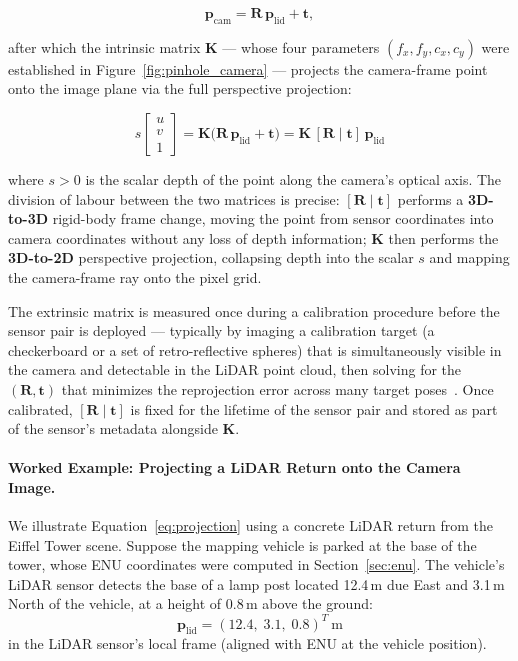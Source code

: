 \documentclass{book}
\begin{document}
\begin{equation}
  \mathbf{p}_{\text{cam}} = \mathbf{R}\,\mathbf{p}_{\text{lid}} + \mathbf{t},
  \label{eq:extrinsic}
\end{equation}

after which the intrinsic matrix $\mathbf{K}$ --- whose four
parameters $(f_x, f_y, c_x, c_y)$ were established in
Figure~\ref{fig:pinhole_camera} --- projects the camera-frame point
onto the image plane via the full perspective projection:

\begin{equation}
  s\begin{bmatrix}u \\ v \\ 1\end{bmatrix}
  = \mathbf{K}\bigl(\mathbf{R}\,\mathbf{p}_{\text{lid}} + \mathbf{t}\bigr)
  = \mathbf{K}\,[\mathbf{R} \mid \mathbf{t}]\,\mathbf{p}_{\text{lid}}
  \label{eq:projection}
\end{equation}

where $s > 0$ is the scalar depth of the point along the camera's
optical axis.  The division of labour between the two matrices is
precise: $[\mathbf{R} \mid \mathbf{t}]$ performs a \textbf{3D-to-3D}
rigid-body frame change, moving the point from sensor coordinates
into camera coordinates without any loss of depth information;
$\mathbf{K}$ then performs the \textbf{3D-to-2D} perspective
projection, collapsing depth into the scalar $s$ and mapping the
camera-frame ray onto the pixel grid.

The extrinsic matrix is measured once during a calibration procedure
before the sensor pair is deployed --- typically by imaging a
calibration target (a checkerboard or a set of retro-reflective
spheres) that is simultaneously visible in the camera and detectable
in the LiDAR point cloud, then solving for the $(\mathbf{R},
\mathbf{t})$ that minimizes the reprojection error across many target
poses~\cite{zhang2000flexible}.  Once calibrated, $[\mathbf{R} \mid
\mathbf{t}]$ is fixed for the lifetime of the sensor pair and stored
as part of the sensor's metadata alongside $\mathbf{K}$.

\paragraph{Worked Example: Projecting a LiDAR Return onto the Camera Image.}

We illustrate Equation~\eqref{eq:projection} using a concrete LiDAR
return from the Eiffel Tower scene.  Suppose the mapping vehicle is
parked at the base of the tower, whose ENU coordinates were computed
in Section~\ref{sec:enu}.  The vehicle's LiDAR sensor detects the
base of a lamp post located 12.4\,m due East and 3.1\,m North of
the vehicle, at a height of 0.8\,m above the ground:
\[
  \mathbf{p}_{\text{lid}} = (12.4,\; 3.1,\; 0.8)^T\ \text{m}
\]
in the LiDAR sensor's local frame (aligned with ENU at the vehicle
position).
\end{document}
